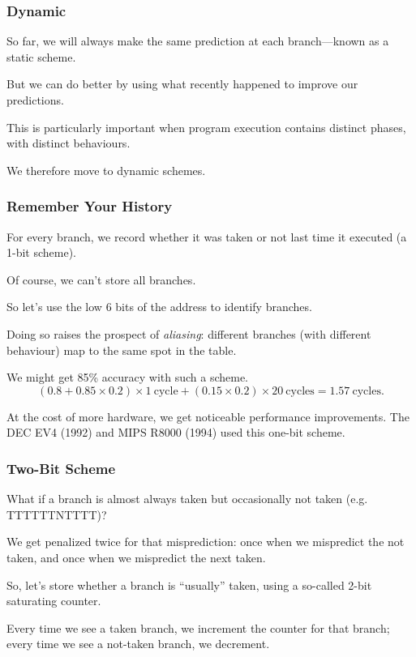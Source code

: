 \begin{frame}
\frametitle{Dynamic}

So far, we will always make the same prediction at each branch---known as a
\alert{static} scheme. 

But we can do better by using what recently happened to
improve our predictions. 

This is particularly important when program execution
contains distinct phases, with distinct behaviours.


We therefore move to \alert{dynamic} schemes.

\end{frame}



\begin{frame}
\frametitle{Remember Your History}

For every branch,
we record whether it was taken or not last time it executed (a 1-bit scheme).


Of course, we can't store all branches. 

So let's use the low 6 bits of the address
to identify branches. 

Doing so raises the prospect of \emph{aliasing}:
different branches (with different behaviour) map to the same spot in the table.

We might get 85\% accuracy with such a scheme.
\[
(0.8 + 0.85 \times 0.2) \times 1 \mathrm{~cycle} + (0.15 \times 0.2) \times 20 \mathrm{~cycles} = 1.57 \mathrm{~cycles}.
\]

At the cost of more hardware, we get noticeable performance improvements. The DEC EV4 (1992) and
MIPS R8000 (1994) used this one-bit scheme.

\end{frame}


\begin{frame}
\frametitle{Two-Bit Scheme}

What if a branch is almost always taken but occasionally not taken (e.g. TTTTTTNTTTT)?

We get penalized twice
for that misprediction: once when we mispredict the not taken, and once when we mispredict the next taken. 

So, let's store whether a branch is ``usually'' taken, using a so-called
2-bit saturating counter.

Every time we see a taken branch, we increment the counter for that
branch; every time we see a not-taken branch, we decrement. 

\end{frame}


